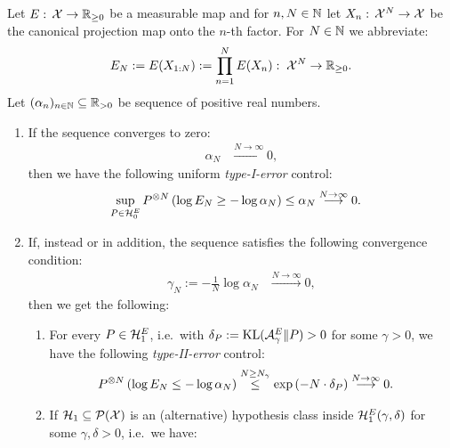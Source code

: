\begin{Thm}
    \label{thm:e-variables-type-I-II-error}
    Let $E:\, \mathcal{X} \to \mathbb{R}_{\ge0}$ be a measurable map and for $n, N \in \mathbb{N}$ let $X_n:\, \mathcal{X}^N \to \mathcal{X}$ be the canonical projection map onto the $n$-th factor.
     For $N \in \mathbb{N}$ we abbreviate: %
     \begin{align*} E_N:=E(X_{1:N}):=\prod_{n =1}^N E(X_n):\; \mathcal{X}^N \to \mathbb{R}_{\ge 0}. \end{align*}
 Let $(\alpha_n)_{n \in \mathbb{N}} \subseteq \mathbb{R}_{>0}$ be sequence of positive real numbers.
 \begin{enumerate}
     \item  If the sequence converges to zero:
 \begin{align*} 
     \alpha_N &\stackrel{N \to \infty}{\longrightarrow} 0,
 \end{align*}
then we have the following uniform \emph{type-I-error} control:
 \begin{align*}
     \sup_{P \in \mathcal{H}_0^E}  P^{\otimes N}\left (\log E_N \ge -\log\alpha_N \right ) & \le \alpha_N \stackrel{N \to \infty}{\longrightarrow} 0.
 \end{align*}
\item If, instead or in addition, the sequence satisfies the following convergence condition:
 \begin{align*} 
     \gamma_N:=-\frac{1}{N} \log \alpha_N &\stackrel{N \to \infty}{\longrightarrow} 0, 
 \end{align*}
then we get the following:
\begin{enumerate}
 \item For every $P \in \mathcal{H}_1^E$, i.e.\ with $\delta_P:=\operatorname{\mathrm{KL}}(\mathcal{A}_\gamma^E\|P) >0$ for some $\gamma >0$,
 we have the following \emph{type-II-error} control:
 \begin{align*}
     P^{\otimes N}\left ( \log E_N \le-\log\alpha_N \right ) & \stackrel{N \ge N_\gamma}{\le} \exp\left ( -N \cdot \delta_P \right ) \stackrel{N \to \infty}{\longrightarrow} 0.
 \end{align*}
 \item If $\mathcal{H}_1 \subseteq \mathcal{P}(\mathcal{X})$ is an (alternative) hypothesis class inside $\mathcal{H}_{1}^E(\gamma,\delta)$ for some $\gamma,\delta >0$, i.e.\ we have:
    \begin{align*}

\end{align*}
\end{enumerate}
\end{enumerate}
\end{Thm}
